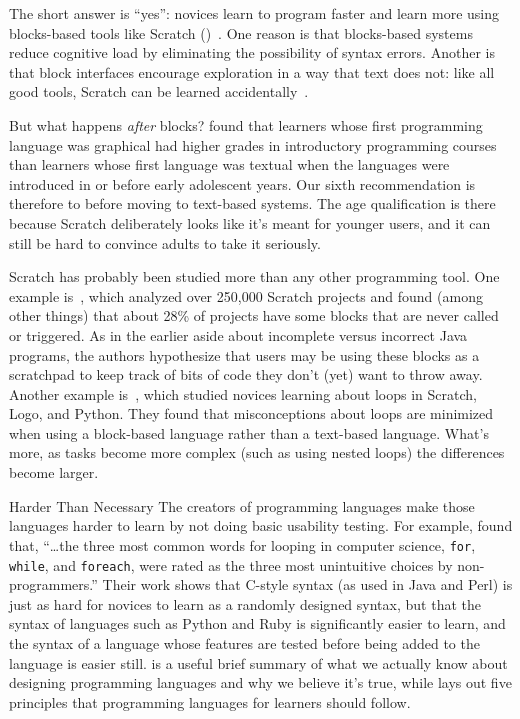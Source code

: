 The short answer is ``yes'':
novices learn to program faster and learn more
using blocks-based tools like Scratch ()~\cite{Wein2017}.
One reason is that blocks-based systems reduce cognitive load by eliminating the possibility of syntax errors.
Another is that block interfaces encourage exploration in a way that text does not:
like all good tools,
Scratch can be learned accidentally~\cite{Malo2010}.

But what happens \emph{after} blocks?
\cite{Chen2018} found that learners whose first programming language was graphical
had higher grades in introductory programming courses
than learners whose first language was textual
when the languages were introduced in or before early adolescent years.
Our sixth recommendation is therefore to
before moving to text-based systems.
The age qualification is there because Scratch deliberately looks like it's meant for younger users,
and it can still be hard to convince adults to take it seriously.


Scratch has probably been studied more than any other programming tool.
One example is~\cite{Aiva2016},
which analyzed over 250,000 Scratch projects
and found (among other things) that about 28\% of projects have some blocks that are never called or triggered.
As in the earlier aside about incomplete versus incorrect Java programs,
the authors hypothesize that users may be using these blocks as a scratchpad
to keep track of bits of code they don't (yet) want to throw away.
Another example is~\cite{Grov2017,Mlad2017},
which studied novices learning about loops in Scratch, Logo, and Python.
They found that misconceptions about loops are minimized when using a block-based language
rather than a text-based language.
What's more,
as tasks become more complex (such as using nested loops)
the differences become larger.

\begin{aside}{Harder Than Necessary}
  The creators of programming languages make those languages harder to learn by not doing basic usability testing.
  For example,
  \cite{Stef2013} found that,
  ``{\ldots}the three most common words for looping in computer science,
  \texttt{for}, \texttt{while}, and \texttt{foreach},
  were rated as the three most unintuitive choices by non-programmers.''
  Their work shows that C-style syntax (as used in Java and Perl)
  is just as hard for novices to learn as a randomly designed syntax,
  but that the syntax of languages such as Python and Ruby
  is significantly easier to learn,
  and the syntax of a language whose features are tested before being added to the language is easier still.
  \cite{Stef2017} is a useful brief summary of what we actually know about designing programming languages
  and why we believe it's true,
  while \cite{Guzd2016} lays out five principles that programming languages for learners should follow.
\end{aside}

